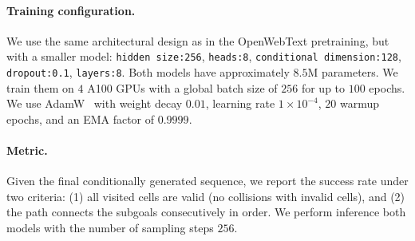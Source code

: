 \paragraph{Training configuration.}
We use the same architectural design as in the OpenWebText pretraining, but with a smaller model:
\texttt{hidden size:256}, \texttt{heads:8}, \texttt{conditional dimension:128}, \texttt{dropout:0.1}, \texttt{layers:8}.
Both models have approximately $8.5$M parameters. We train them on $4$ A100 GPUs with a global batch size of $256$ for up to $100$ epochs. We use AdamW~\citep{loshchilov2017decoupled} with weight decay $0.01$, learning rate $1\times 10^{-4}$, $20$ warmup epochs, and an EMA factor of $0.9999$.

\paragraph{Metric.}
Given the final conditionally generated sequence, we report the success rate under two criteria: (1) all visited cells are valid (no collisions with invalid cells), and (2) the path connects the subgoals consecutively in order. We perform inference both models with the number of sampling steps $256$.


